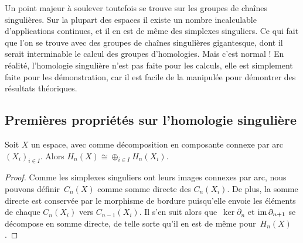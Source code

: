 Un point majeur à soulever toutefois se trouve sur les groupes de chaînes singulières. Sur la plupart des espaces il existe un nombre incalculable d'applications continues, et il en est de même des simplexes singuliers. Ce qui fait que l'on se trouve avec des groupes de chaînes singulières gigantesque, dont il serait interminable le calcul des groupes d'homologies. Mais c'est normal ! En réalité, l'homologie singulière n'est pas faite pour les calculs, elle est simplement faite pour les démonstration, car il est facile de la manipulée pour démontrer des résultats théoriques.

\subsection{Premières propriétés sur l'homologie singulière}

\begin{proposition}
Soit $X$ un espace, avec comme décomposition en composante connexe par arc~$(X_i)_{i\in I}$. Alors $H_n(X)\cong\oplus_{i\in I} H_n(X_i)$.
\end{proposition}
\begin{proof}
Comme les simplexes singuliers ont leurs images connexes par arc, nous pouvons définir~$C_n(X)$ comme somme directe des $C_n(X_i)$. De plus, la somme directe est conservée par le morphisme de bordure puisqu'elle envoie les éléments de chaque $C_n(X_i)$ vers $C_{n-1}(X_{i})$. Il s'en suit alors que~$\ker\partial_n$ et $\mathrm{im}\,\partial_{n+1}$ se décompose en somme directe, de telle sorte qu'il en est de même pour~$H_n(X)$.
\end{proof}

